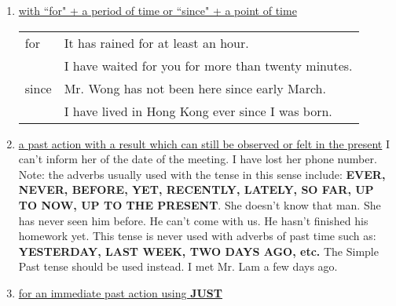 \begin{enumerate}
    \item \underline{with ``for" + a period of time or ``since" + a point of time}
        \newline
        \newline
        \begin{tabular}{ll}
            for & It has rained for at least an hour. \\
                & I have waited for you for more than twenty minutes. \\
            since & Mr. Wong has not been here since early March. \\
                  & I have lived in Hong Kong ever since I was born.
        \end{tabular}
    \item \underline{a past action with a result which can still be observed or felt in the present}
        \newline
        \newline
        I can't inform her of the date of the meeting.
        I have lost her phone number.
        \newline
        \newline
        Note: the adverbs usually used with the tense in this sense include:
        \newline
        \textbf{EVER, NEVER, BEFORE, YET, RECENTLY, LATELY, SO FAR, UP TO NOW,
        UP TO THE PRESENT}.
        \newline
        \newline
        She doesn't know that man. She has never seen him before.
        \newline
        \newline
        He can't come with us. He hasn't finished his homework yet.
        \newline
        \newline
        This tense is never used with adverbs of past time such as:
        \newline
        \textbf{YESTERDAY, LAST WEEK, TWO DAYS AGO, etc.}
        The Simple Past tense should be used instead.
        \newline
        \newline
        I met Mr. Lam a few days ago.
    \item \underline{for an immediate past action using \textbf{JUST}}
        \newline
        \newline

\end{enumerate}
